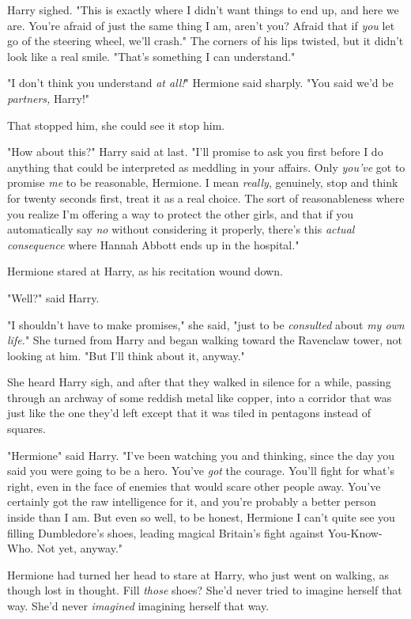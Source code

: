 Harry sighed. "This is exactly where I didn't want things to end up, and here
we are. You're afraid of just the same thing I am, aren't you? Afraid that if
\emph{you} let go of the steering wheel, we'll crash." The corners of his lips
twisted, but it didn't look like a real smile. "That's something I can
understand."

"I don't think you understand \emph{at all!}" Hermione said sharply. "You said
we'd be \emph{partners,} Harry!"

That stopped him, she could see it stop him.

"How about this?" Harry said at last. "I'll promise to ask you first before I
do anything that could be interpreted as meddling in your affairs. Only
\emph{you've} got to promise \emph{me} to be reasonable, Hermione. I mean
\emph{really}, genuinely, stop and think for twenty seconds first, treat it as
a real choice. The sort of reasonableness where you realize I'm offering a way
to protect the other girls, and that if you automatically say \emph{no} without
considering it properly, there's this \emph{actual consequence} where Hannah
Abbott ends up in the hospital."

Hermione stared at Harry, as his recitation wound down.

"Well?" said Harry.

"I shouldn't have to make promises," she said, "just to be \emph{consulted}
about \emph{my own life.}" She turned from Harry and began walking toward the
Ravenclaw tower, not looking at him. "But I'll think about it, anyway."

She heard Harry sigh, and after that they walked in silence for a while,
passing through an archway of some reddish metal like copper, into a corridor
that was just like the one they'd left except that it was tiled in pentagons
instead of squares.

"Hermione{\el}" said Harry. "I've been watching you and thinking, since the
day you said you were going to be a hero. You've \emph{got} the courage. You'll
fight for what's right, even in the face of enemies that would scare other
people away. You've certainly got the raw intelligence for it, and you're
probably a better person inside than I am. But even so{\el} well, to be
honest, Hermione{\el} I can't quite see you filling Dumbledore's shoes,
leading magical Britain's fight against You-Know-Who. Not yet, anyway."

Hermione had turned her head to stare at Harry, who just went on walking, as
though lost in thought. Fill \emph{those} shoes? She'd never tried to imagine
herself that way. She'd never \emph{imagined} imagining herself that way.

